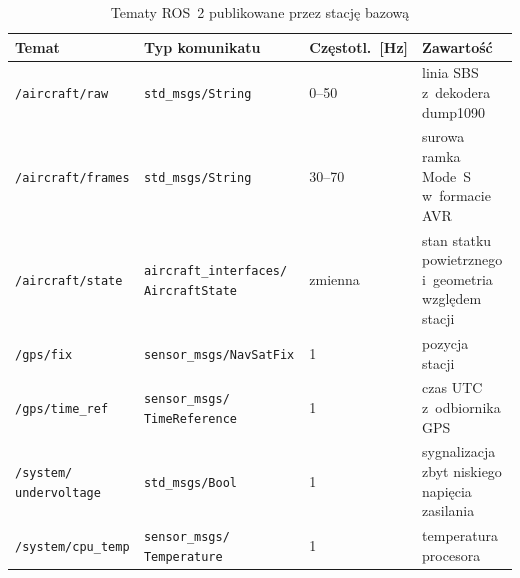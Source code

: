 \begin{table}[!htb]
  \centering
  \caption{Tematy ROS~2 publikowane przez stację bazową}
  \label{tab:tematy}
  \footnotesize
  \begin{tabular}{>{\raggedright}p{3.3cm} >{\raggedright}p{4.0cm} p{1.7cm} >{\raggedright\arraybackslash}p{4.9cm}}
    \toprule
    Temat & Typ komunikatu & Częstotl.\ [Hz] & Zawartość \\
    \midrule
    \texttt{/aircraft/raw}        & \texttt{std\_msgs/String}         & 0--50   & linia SBS z~dekodera dump1090 \\
    \texttt{/aircraft/frames}     & \texttt{std\_msgs/String}         & 30--70  & surowa ramka Mode~S w~formacie AVR \\
    \texttt{/aircraft/state}      & \texttt{aircraft\_interfaces/ AircraftState} & zmienna & stan statku powietrznego i~geometria względem stacji \\
    \texttt{/gps/fix}             & \texttt{sensor\_msgs/NavSatFix}   & 1       & pozycja stacji \\
    \texttt{/gps/time\_ref}       & \texttt{sensor\_msgs/ TimeReference} & 1    & czas UTC z~odbiornika GPS \\
    \texttt{/system/ undervoltage} & \texttt{std\_msgs/Bool}           & 1       & sygnalizacja zbyt niskiego napięcia zasilania \\
    \texttt{/system/cpu\_temp}    & \texttt{sensor\_msgs/ Temperature} & 1       & temperatura procesora \\
    \bottomrule
  \end{tabular}
\end{table}

